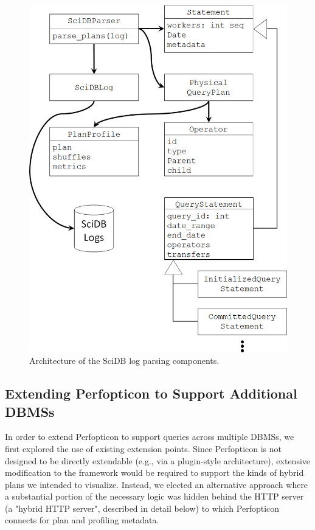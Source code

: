 \documentclass{chi2009}
\begin{document}
\begin{figure}[h]
\begin{center}
\includegraphics[scale=0.25]{log-scraping.png}
\end{center}
\caption{Architecture of the SciDB log parsing components.}
\label{fig:scidb-log-parsing}
\end{figure}


\subsection{Extending Perfopticon to Support Additional DBMSs}

In order to extend Perfopticon to support queries across multiple DBMSs, we first explored the use of existing extension points.  Since Perfopticon is not designed to be directly extendable (e.g., via a plugin-style architecture), extensive modification to the framework would be required to support the kinds of hybrid plans we intended to visualize.  Instead, we elected an alternative approach where a substantial portion of the necessary logic was hidden behind the HTTP server (a "hybrid HTTP server", described in detail below) to which Perfopticon connects for plan and profiling metadata.
\end{document}
